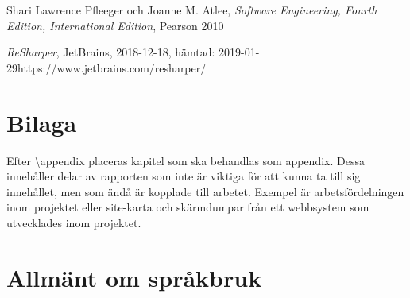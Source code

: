 \documentclass[a4paper,12pt,oneside,final]{extbook}
\begin{document}
\begin{thebibliography}{99}

  Shari Lawrence Pfleeger och Joanne M. Atlee, \emph{Software Engineering, Fourth Edition, International Edition}, Pearson 2010

 \emph{ReSharper}, JetBrains, 2018-12-18, hämtad: 2019-01-29\newline https://www.jetbrains.com/resharper/

\end{thebibliography}


\appendix

\chapter{Bilaga}

Efter \textbackslash appendix placeras kapitel som ska behandlas som
appendix. Dessa innehåller delar av rapporten som inte är viktiga för
att kunna ta till sig innehållet, men som ändå är kopplade till
arbetet. Exempel är arbetsfördelningen inom projektet eller site-karta
och skärmdumpar från ett webbsystem som utvecklades inom projektet.


\chapter{Allmänt om språkbruk}
\end{document}
